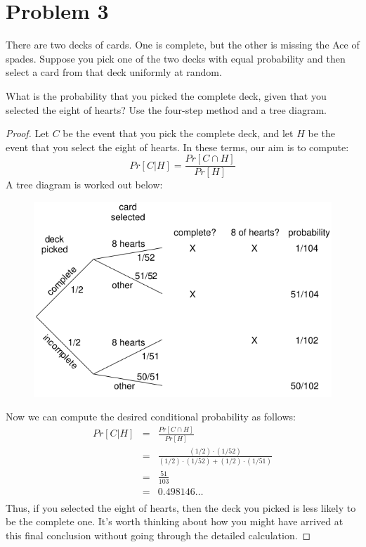 \documentclass[14pt]{extarticle}
\newcommand{\dps}{\displaystyle}
\begin{document}
\section{Problem 3}
There are two decks of cards. One is complete, but the other is missing the Ace of spades. Suppose you pick one of the two decks with equal probability and then select a card from that deck uniformly at random.

What is the probability that you picked the complete deck, given that you selected the eight of hearts? Use the four-step method and a tree diagram.

\begin{proof}
Let $C$ be the event that you pick the complete deck, and let $H$ be the event that you select the eight of hearts. In these terms, our aim is to compute:
$$
Pr[C|H] = \frac{Pr[C \cap H]}{Pr[H]}
$$
A tree diagram is worked out below:

\begin{figure}[ht!]
\centering
\includegraphics[scale=0.5]{two-decks.png}
\end{figure}

Now we can compute the desired conditional probability as follows:
$$
\begin{array}{rcl}
Pr[C|H] & = & \dps\frac{Pr[C \cap H]}{Pr[H]}\\
& = & \dps\frac{(1/2)\cdot(1/52)}{(1/2)\cdot(1/52) + (1/2)\cdot(1/51)}\\
& = & \dps\frac{51}{103}\\
& = & 0.498146\ldots\\
\end{array}
$$
Thus, if you selected the eight of hearts, then the deck you picked is less likely to be the complete one. It’s worth thinking about how you might have arrived at this final conclusion without going
through the detailed calculation.
\end{proof}
\end{document}
